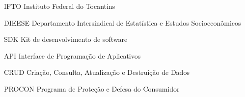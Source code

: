 \documentclass{ifto-tex}
\begin{document}

\frenchspacing 

\pretextual

\imprimircapa

\imprimirfolhaderosto

\listoffigures*
\cleardoublepage


\listoftables*
\cleardoublepage

\begin{siglas}
	\item[IFTO]{Instituto Federal do Tocantins}
	\item[DIEESE]{Departamento Intersindical de Estatística e Estudos Socioeconômicos}
	\item[SDK]{Kit de desenvolvimento de software}
	\item [API]{Interface de Programação de Aplicativos}
	\item[CRUD]{Criação, Consulta, Atualização e Destruição de Dados}
	\item[PROCON]{Programa de Proteção e Defesa do Consumidor}
\end{siglas}


\tableofcontents*
\cleardoublepage

\end{document}

